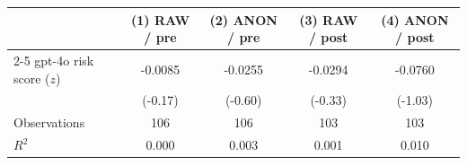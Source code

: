 \begin{tabular}{lcccc}
\toprule
& \multicolumn{1}{c}{(1) RAW / pre} & \multicolumn{1}{c}{(2) ANON / pre} & \multicolumn{1}{c}{(3) RAW / post} & \multicolumn{1}{c}{(4) ANON / post} \\
\cmidrule(lr){2-5}
gpt-4o risk score ($z$) & -0.0085 & -0.0255 & -0.0294 & -0.0760 \\
 & (-0.17) & (-0.60) & (-0.33) & (-1.03) \\[3pt]
\midrule
Observations & 106 & 106 & 103 & 103 \\
$R^2$ & 0.000 & 0.003 & 0.001 & 0.010 \\
\bottomrule
\end{tabular}